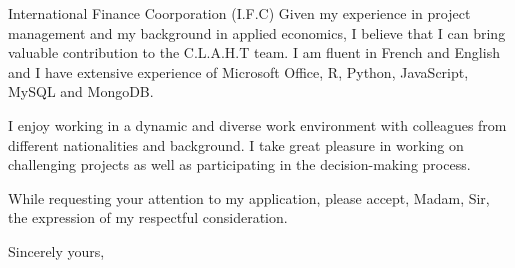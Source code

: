 \documentclass[11pt]{letter} %
\begin{document}
\begin{letter}{International Finance Coorporation (I.F.C) }
Given my experience in project management and my background in applied economics, I believe that I can bring valuable contribution to the C.L.A.H.T team. I am fluent in French and English and I have extensive experience of Microsoft Office, R, Python, JavaScript, MySQL and MongoDB.

I enjoy working in a dynamic and diverse work environment with colleagues from different nationalities and background. I take great pleasure in working on challenging projects as well as  participating in the decision-making process.

While requesting your attention to my application, please  accept, Madam, Sir, the expression of my respectful consideration.

\closing{Sincerely yours,}




\end{letter}
\end{document}
